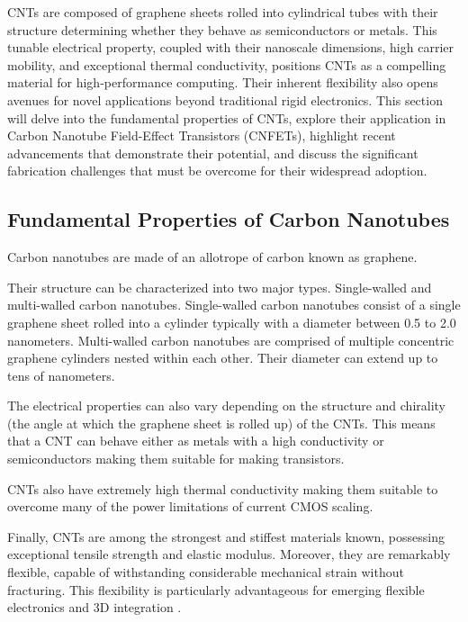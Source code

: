 \documentclass[sigconf]{acmart}
\begin{document}
CNTs are composed of graphene sheets rolled into cylindrical tubes
with their structure determining whether they behave as
semiconductors or metals. This tunable electrical property,
coupled with their nanoscale dimensions, 
high carrier mobility, and exceptional thermal conductivity, 
positions CNTs as a compelling material for high-performance 
computing. Their inherent flexibility also opens avenues for 
novel applications beyond traditional rigid electronics. 
This section will delve into the fundamental properties of 
CNTs, explore their application in Carbon Nanotube Field-Effect 
Transistors (CNFETs), highlight recent advancements that 
demonstrate their potential, and discuss the significant 
fabrication challenges that must be overcome for their widespread 
adoption.

\subsection{Fundamental Properties of Carbon Nanotubes}
Carbon nanotubes are made of an allotrope of carbon known as 
graphene.

Their structure can be characterized into two major types.
Single-walled and multi-walled carbon nanotubes. Single-walled 
carbon nanotubes consist of a single graphene sheet rolled into 
a cylinder typically with a diameter between 0.5 to 2.0 
nanometers. Multi-walled carbon nanotubes are comprised of 
multiple concentric graphene cylinders nested within each other. 
Their diameter can extend up to tens of nanometers. 

The electrical properties can also vary depending on the structure 
and chirality (the angle at which the graphene sheet
is rolled up) of the CNTs. This means that a CNT can behave either 
as metals with a high conductivity or semiconductors making them 
suitable for making transistors. 

CNTs also have extremely high thermal conductivity making them
suitable to overcome many of the power limitations of current 
CMOS scaling.

Finally, CNTs are among the strongest and stiffest materials 
known, possessing exceptional tensile strength and elastic 
modulus. Moreover, they are remarkably flexible, capable of 
withstanding considerable mechanical strain without fracturing. 
This flexibility is particularly advantageous for emerging 
flexible electronics and 3D integration \cite{appenzeller2008carbon}. 
\end{document}
